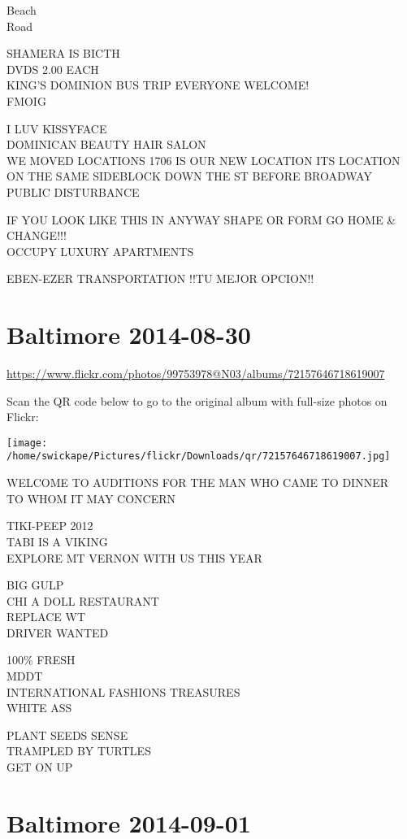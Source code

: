 \documentclass[10pt,letterpaper]{article}
\begin{document}
Beach\\
Road

SHAMERA IS BICTH\\
DVDS 2.00 EACH\\
KING'S DOMINION BUS TRIP EVERYONE WELCOME!\\
FMOIG

I LUV KISSYFACE\\
DOMINICAN BEAUTY HAIR SALON\\
WE MOVED LOCATIONS 1706 IS OUR NEW LOCATION ITS LOCATION ON THE SAME SIDEBLOCK DOWN THE ST BEFORE BROADWAY\\
PUBLIC DISTURBANCE

IF YOU LOOK LIKE THIS IN ANYWAY SHAPE OR FORM GO HOME \& CHANGE!!!\\
OCCUPY LUXURY APARTMENTS

EBEN{-}EZER TRANSPORTATION  !!TU MEJOR OPCION!!
\pagebreak

\section*{Baltimore 2014-08-30}

\url{https://www.flickr.com/photos/99753978@N03/albums/72157646718619007}

Scan the QR code below to go to the original album with full-size photos on Flickr:

\texttt{[image: /home/swickape/Pictures/flickr/Downloads/qr/72157646718619007.jpg]}
\pagebreak

WELCOME TO AUDITIONS FOR THE MAN WHO CAME TO DINNER\\
TO WHOM IT MAY CONCERN

TIKI{-}PEEP 2012\\
TABI IS A VIKING\\
EXPLORE MT VERNON WITH US THIS YEAR

BIG GULP\\
CHI A DOLL RESTAURANT\\
REPLACE WT\\
DRIVER WANTED

100\% FRESH\\
MDDT\\
INTERNATIONAL FASHIONS TREASURES\\
WHITE ASS

PLANT SEEDS SENSE\\
TRAMPLED BY TURTLES\\
GET ON UP
\pagebreak

\section*{Baltimore 2014-09-01}
\end{document}
